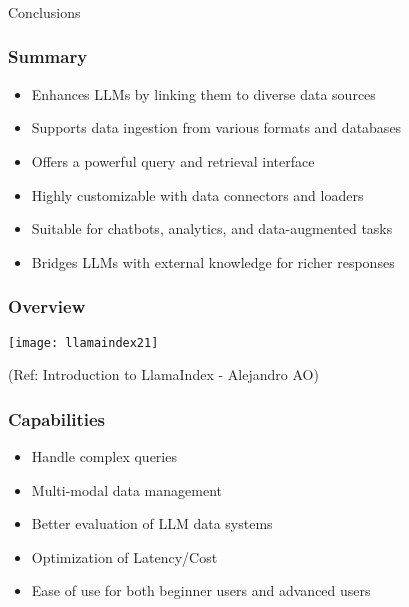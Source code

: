 \begin{frame}[fragile]\frametitle{}
\begin{center}
{\Large Conclusions}
\end{center}
\end{frame}

\begin{frame}[fragile]\frametitle{Summary}
    \begin{itemize}
        \item Enhances LLMs by linking them to diverse data sources
        \item Supports data ingestion from various formats and databases
        \item Offers a powerful query and retrieval interface
        \item Highly customizable with data connectors and loaders
        \item Suitable for chatbots, analytics, and data-augmented tasks
        \item Bridges LLMs with external knowledge for richer responses
    \end{itemize}
\end{frame}

\begin{frame}[fragile]\frametitle{Overview}

\begin{center}
\texttt{[image: llamaindex21]}

{\tiny (Ref: Introduction to LlamaIndex - Alejandro AO)}
\end{center}
\end{frame}


\begin{frame}[fragile]\frametitle{Capabilities}


\begin{itemize}
\item Handle complex queries
\item Multi-modal data management
\item Better evaluation of LLM data systems
\item Optimization of Latency/Cost
\item Ease of use for both beginner users and advanced users
\end{itemize}	

\end{frame}

